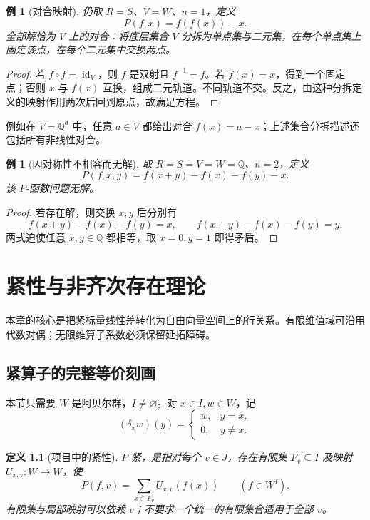 \documentclass[11pt,a4paper,oneside,openany]{book}
\theoremstyle{lecture}
\newtheorem{definition}[theorem]{定义}
\newtheorem{example}[theorem]{例}
\numberwithin{equation}{section}
\begin{document}
\begin{example}[对合映射]
仍取 $R=S$、$V=W$、$n=1$，定义
\[
 P(f,x)=f(f(x))-x.
\]
全部解恰为 $V$ 上的对合：将底层集合 $V$ 分拆为单点集与二元集，在每个单点集上固定该点，在每个二元集中交换两点。
\end{example}
\begin{proof}
若 $f\circ f=\operatorname{id}_V$，则 $f$ 是双射且 $f^{-1}=f$。若 $f(x)=x$，得到一个固定点；否则 $x$ 与 $f(x)$ 互换，组成二元轨道。不同轨道不交。反之，由这种分拆定义的映射作用两次后回到原点，故满足方程。
\end{proof}
例如在 $V=\mathbb Q^d$ 中，任意 $a\in V$ 都给出对合 $f(x)=a-x$；上述集合分拆描述还包括所有非线性对合。

\begin{example}[因对称性不相容而无解]
取 $R=S=V=W=\mathbb Q$、$n=2$，定义
\[
 P(f,x,y)=f(x+y)-f(x)-f(y)-x.
\]
该 $P$-函数问题无解。
\end{example}
\begin{proof}
若存在解，则交换 $x,y$ 后分别有
\[
 f(x+y)-f(x)-f(y)=x,\qquad
 f(x+y)-f(x)-f(y)=y.
\]
两式迫使任意 $x,y\in\mathbb Q$ 都相等，取 $x=0,y=1$ 即得矛盾。
\end{proof}


\chapter{紧性与非齐次存在理论}\label{ch:compact}
本章的核心是把紧标量线性差转化为自由向量空间上的行关系。有限维值域可沿用代数对偶；无限维算子系数必须保留延拓障碍。
\section{紧算子的完整等价刻画}\label{lin:sec:compact}
本节只需要 $W$ 是阿贝尔群，$I\ne\varnothing$。对 $x\in I,w\in W$，记
\[
 (\delta_xw)(y)=\begin{cases}w,&y=x,\\0,&y\ne x.\end{cases}
\]
\begin{definition}[项目中的紧性]
$P$ 紧，是指对每个 $v\in J$，存在有限集 $F_v\subseteq I$ 及映射 $U_{x,v}:W\to W$，使
\begin{equation}\label{lin:eq:compact}
 P(f,v)=\sum_{x\in F_v}U_{x,v}(f(x))\qquad(f\in W^I).
\end{equation}
有限集与局部映射可以依赖 $v$；不要求一个统一的有限集合适用于全部 $v$。
\end{definition}
\end{document}
